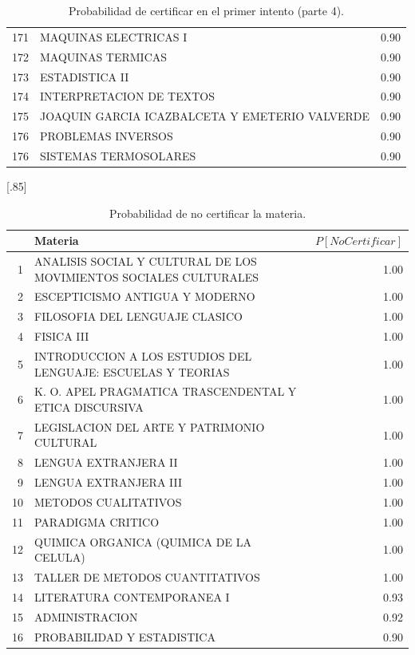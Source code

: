 \documentclass[12pt]{article}
\begin{document}
\begin{table}[ht]
{\begin{tabular}{rlr}
  171 & MAQUINAS ELECTRICAS I & 0.90 \\ 
  172 & MAQUINAS TERMICAS & 0.90 \\ 
  173 & ESTADISTICA II & 0.90 \\ 
  174 & INTERPRETACION DE TEXTOS & 0.90 \\ 
  175 & JOAQUIN GARCIA ICAZBALCETA Y EMETERIO VALVERDE & 0.90 \\ 
  176 & PROBLEMAS INVERSOS & 0.90 \\ 
  176 & SISTEMAS TERMOSOLARES & 0.90 \\ 
   \hline
\end{tabular}
}\caption{\label{Prob_Cert_Intento_4}Probabilidad de certificar en el primer intento (parte 4).}

\end{table}

\begin{table}[ht]
\centering
\scalebox{0.75}[.85]{
\begin{tabular}{rlr}
  \hline
 & Materia & $P[NoCertificar]$ \\ 
  \hline
1 & ANALISIS SOCIAL Y CULTURAL DE LOS MOVIMIENTOS SOCIALES CULTURALES & 1.00 \\ 
  2 & ESCEPTICISMO ANTIGUA Y MODERNO & 1.00 \\ 
  3 & FILOSOFIA DEL LENGUAJE CLASICO & 1.00 \\ 
  4 & FISICA III & 1.00 \\ 
  5 & INTRODUCCION A LOS ESTUDIOS DEL LENGUAJE: ESCUELAS Y TEORIAS & 1.00 \\ 
  6 & K. O. APEL PRAGMATICA TRASCENDENTAL Y ETICA DISCURSIVA & 1.00 \\ 
  7 & LEGISLACION DEL ARTE Y PATRIMONIO CULTURAL & 1.00 \\ 
  8 & LENGUA EXTRANJERA II & 1.00 \\ 
  9 & LENGUA EXTRANJERA III & 1.00 \\ 
  10 & METODOS CUALITATIVOS & 1.00 \\ 
  11 & PARADIGMA CRITICO & 1.00 \\ 
  12 & QUIMICA ORGANICA (QUIMICA DE LA CELULA) & 1.00 \\ 
  13 & TALLER DE METODOS CUANTITATIVOS & 1.00 \\ 
  14 & LITERATURA CONTEMPORANEA I & 0.93 \\ 
  15 & ADMINISTRACION & 0.92 \\ 
  16 & PROBABILIDAD Y ESTADISTICA & 0.90 \\ 
   \hline
\end{tabular}}
\caption{\label{Prob_No_Cert}Probabilidad de no certificar la materia.}
\end{table}
\end{document}
